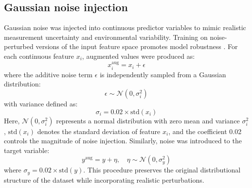 \documentclass[oneside,doublespacing,flushright]{lsuthesis}
\begin{document}
\subsection{Gaussian noise injection}
Gaussian noise was injected into continuous predictor variables to mimic realistic measurement uncertainty and environmental variability. Training on noise-perturbed versions of the input feature space promotes model robustness \citep{Bishop1995}. For each continuous feature $x_i$, augmented values were produced as:
\begin{equation}
x_i^{\text{aug}} = x_i + \epsilon
\end{equation}
where the additive noise term $\epsilon$ is independently sampled from a Gaussian distribution:
\begin{equation}
\epsilon \sim \mathcal{N}(0, \sigma_i^2)
\end{equation}
with variance defined as:
\begin{equation}
\sigma_i = 0.02 \times \text{std}(x_i)
\end{equation}
Here, $\mathcal{N}(0, \sigma_i^2)$ represents a normal distribution with zero mean and variance $\sigma_i^2$, $\text{std}(x_i)$ denotes the standard deviation of feature $x_i$, and the coefficient 0.02 controls the magnitude of noise injection. Similarly, noise was introduced to the target variable:
\begin{equation}
y^{\text{aug}} = y + \eta, \quad \eta \sim \mathcal{N}(0, \sigma_y^2)
\end{equation}
where $\sigma_y = 0.02 \times \text{std}(y)$. This procedure preserves the original distributional structure of the dataset while incorporating realistic perturbations.
\end{document}
